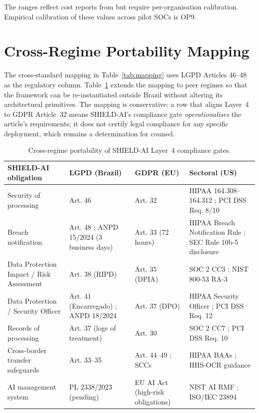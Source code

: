 \documentclass[preprint,12pt,authoryear]{elsarticle}
\begin{document}
The ranges reflect cost reports from \citet{ibm2025costbreach,dbir2025} but require per-organisation calibration. Empirical calibration of these values across pilot SOCs is OP9.

\section{Cross-Regime Portability Mapping}
\label{app:portability}
The cross-standard mapping in Table~\ref{tab:mapping} uses LGPD Articles 46--48 as the regulatory column. Table~\ref{tab:portability} extends the mapping to peer regimes so that the framework can be re-instantiated outside Brazil without altering its architectural primitives. The mapping is conservative: a row that aligns Layer~4 to GDPR Article~32 means SHIELD-AI's compliance gate \emph{operationalises} the article's requirements; it does not certify legal compliance for any specific deployment, which remains a determination for counsel.

\begin{table}[ht]
\centering
\caption{Cross-regime portability of SHIELD-AI Layer~4 compliance gates.}
\label{tab:portability}
\small
\begin{tabular}{p{3.3cm}p{2.8cm}p{2.8cm}p{2.8cm}}
\toprule
\textbf{SHIELD-AI obligation} & \textbf{LGPD (Brazil)} & \textbf{GDPR (EU)} & \textbf{Sectoral (US)} \\
\midrule
Security of processing      & Art. 46 & Art. 32 & HIPAA 164.308--164.312 ; PCI DSS Req. 8/10 \\
Breach notification        & Art. 48 ; ANPD 15/2024 (3 business days) & Art. 33 (72 hours) & HIPAA Breach Notification Rule ; SEC Rule 10b-5 disclosure \\
Data Protection Impact / Risk Assessment & Art. 38 (RIPD) & Art. 35 (DPIA) & SOC 2 CC3 ; NIST 800-53 RA-3 \\
Data Protection / Security Officer & Art. 41 (Encarregado) ; ANPD 18/2024 & Art. 37 (DPO) & HIPAA Security Officer ; PCI DSS Req. 12 \\
Records of processing      & Art. 37 (logs of treatment) & Art. 30 & SOC 2 CC7 ; PCI DSS Req. 10 \\
Cross-border transfer safeguards & Art. 33--35 & Art. 44--49 ; SCCs & HIPAA BAAs ; HHS-OCR guidance \\
AI management system       & PL 2338/2023 (pending) & EU AI Act (high-risk obligations) & NIST AI RMF ; ISO/IEC 23894 \\
\bottomrule
\end{tabular}
\end{table}
\end{document}
